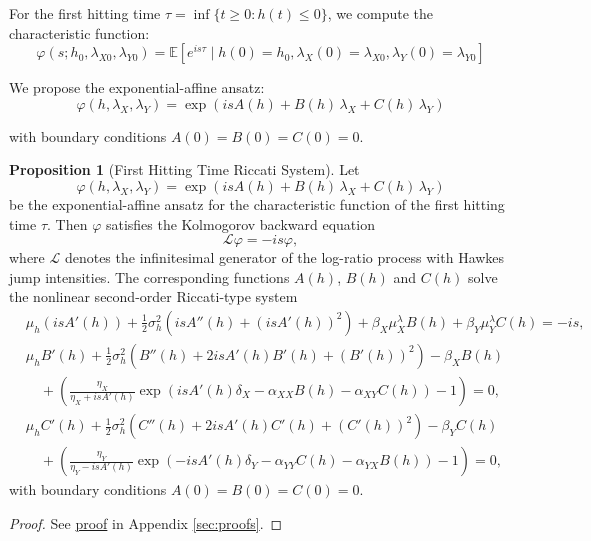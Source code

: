 \documentclass{article}
\theoremstyle{definition}
\newtheorem{proposition}{Proposition}[section]
\newcommand{\proofref}[1]{\hyperlink{#1}{proof}}
\begin{document}
For the first hitting time $\tau = \inf\{t \geq 0 : h(t) \leq 0\}$, we compute the characteristic function:
\begin{equation}
\varphi(s; h_0, \lambda_{X0}, \lambda_{Y0}) = \mathbb{E}[e^{is\tau} \mid h(0) = h_0, \lambda_X(0) = \lambda_{X0}, \lambda_Y(0) = \lambda_{Y0}]
\end{equation}

We propose the exponential-affine ansatz:
\begin{equation}
\varphi(h, \lambda_X, \lambda_Y) = \exp\!\left( i s A(h) + B(h)\,\lambda_X + C(h)\,\lambda_Y \right) \label{eq:ansatz}
\end{equation}

with boundary conditions $A(0) = B(0) = C(0) = 0$.

\begin{proposition}[First Hitting Time Riccati System]
\label{prop:riccati}
Let 
\[
\varphi(h, \lambda_X, \lambda_Y) 
= \exp\!\left( i s A(h) + B(h)\,\lambda_X + C(h)\,\lambda_Y \right)
\]
be the exponential-affine ansatz for the characteristic function of the first hitting time $\tau$. Then $\varphi$ satisfies the Kolmogorov backward equation
\[
\mathcal{L}\varphi = -i s \varphi,
\]
where $\mathcal{L}$ denotes the infinitesimal generator of the log-ratio process with Hawkes jump intensities. The corresponding functions $A(h)$, $B(h)$ and $C(h)$ solve the nonlinear second-order Riccati-type system
\[
\begin{aligned}
& \mu_h (i s A'(h)) 
+ \frac{1}{2}\sigma_h^2 \left( i s A''(h) + (i s A'(h))^2 \right)
+ \beta_X \mu_X^\lambda B(h) 
+ \beta_Y \mu_Y^\lambda C(h) 
= - i s, \\[1.2ex]
& \mu_h B'(h) 
+ \frac{1}{2}\sigma_h^2 \left( B''(h) + 2 i s A'(h) B'(h) + (B'(h))^2 \right)
- \beta_X B(h) \\
&\quad + \left( \frac{\eta_X}{\eta_X + i s A'(h)} 
\exp\!\left( i s A'(h)\delta_X - \alpha_{XX} B(h) - \alpha_{XY} C(h) \right) - 1 \right) 
= 0, \\[1.2ex]
& \mu_h C'(h) 
+ \frac{1}{2}\sigma_h^2 \left( C''(h) + 2 i s A'(h) C'(h) + (C'(h))^2 \right)
- \beta_Y C(h) \\
&\quad + \left( \frac{\eta_Y}{\eta_Y - i s A'(h)} 
\exp\!\left( -i s A'(h)\delta_Y - \alpha_{YY} C(h) - \alpha_{YX} B(h) \right) - 1 \right) 
= 0,
\end{aligned}
\]
with boundary conditions $A(0) = B(0) = C(0) = 0$.
\end{proposition}

\begin{proof}
See \proofref{prop:riccati} in Appendix \ref{sec:proofs}.
\end{proof}
\end{document}
